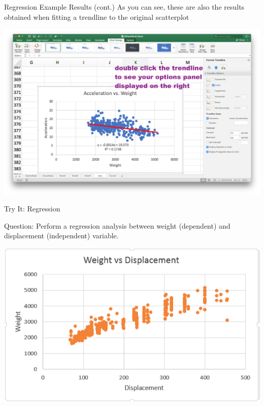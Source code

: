\documentclass[xcolor=svgnames, handout]{beamer}
\begin{document}
\begin{frame}[label=current]{Regression Example Results (cont.)}
As you can see, these are also the results obtained when fitting a trendline to the original scatterplot
\begin{center}
\includegraphics[width=.9\textwidth]{trendlineinfo}
\end{center}

\end{frame}



\begin{frame}[label=current]{Try It: Regression}
\begin{exampleblock}
{Question:} Perform a regression analysis between weight (dependent) and displacement (independent) variable.
\end{exampleblock}
\begin{center}
\includegraphics[width=.7\textwidth]{WvsD}
\end{center}
\end{frame}
\end{document}
